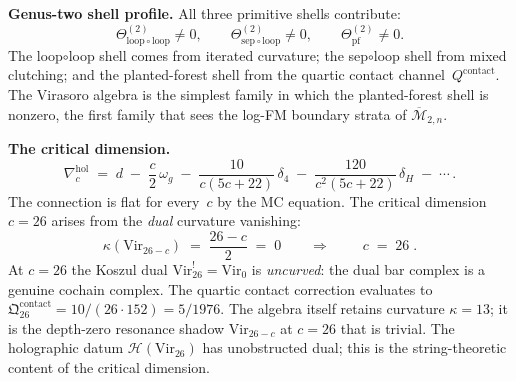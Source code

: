 \documentclass[11pt]{report}
\theoremstyle{definition}
\theoremstyle{remark}
\numberwithin{equation}{section}
\begin{document}
\medskip
\noindent\textbf{Genus-two shell profile.}
All three primitive shells contribute:
\[
\Theta^{(2)}_{\mathrm{loop}\circ\mathrm{loop}}\neq 0,
\qquad
\Theta^{(2)}_{\mathrm{sep}\circ\mathrm{loop}}\neq 0,
\qquad
\Theta^{(2)}_{\mathrm{pf}}\neq 0.
\]
The loop$\circ$loop shell comes from iterated curvature; the
sep$\circ$loop shell from mixed clutching; and the planted-forest
shell from the quartic contact channel~$Q^{\mathrm{contact}}$. The
Virasoro algebra is the simplest family in which the planted-forest
shell is nonzero, the first family that sees the log-FM boundary
strata of $\overline{\mathcal M}_{2,n}$.


\medskip

\noindent\textbf{The critical dimension.}\enspace
\[
\nabla^{\mathrm{hol}}_c
\;=\;
d
\;-\;\frac{c}{2}\,\omega_g
\;-\;\frac{10}{c(5c+22)}\,\delta_4
\;-\;\frac{120}{c^2(5c+22)}\,\delta_H
\;-\;\cdots\,.
\]
The connection is flat for every~$c$ by the MC equation.
The critical dimension $c=26$ arises from the \emph{dual}
curvature vanishing:
\[
\kappa(\mathrm{Vir}_{26-c})\;=\;\frac{26-c}{2}\;=\;0
\qquad\Longrightarrow\qquad
\boxed{\;c\;=\;26\;}.
\]
At $c=26$ the Koszul dual
$\mathrm{Vir}_{26}^!=\mathrm{Vir}_0$ is \emph{uncurved}:
the dual bar complex is a genuine cochain complex.
The quartic contact correction evaluates to
$\mathfrak Q^{\mathrm{contact}}_{26}
=10/(26\cdot 152)=5/1976$.
The algebra itself retains curvature $\kappa=13$; it is
the depth-zero resonance shadow $\mathrm{Vir}_{26-c}$
at $c=26$ that is trivial.
The holographic datum $\mathcal H(\mathrm{Vir}_{26})$
has unobstructed dual; this is the string-theoretic content
of the critical dimension.
\end{document}
